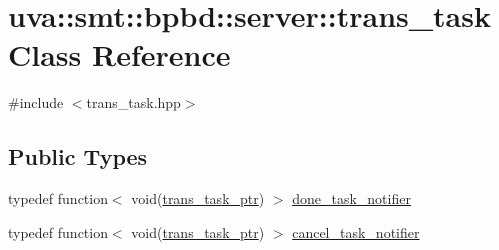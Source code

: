 \hypertarget{classuva_1_1smt_1_1bpbd_1_1server_1_1trans__task}{}\section{uva\+:\+:smt\+:\+:bpbd\+:\+:server\+:\+:trans\+\_\+task Class Reference}
\label{classuva_1_1smt_1_1bpbd_1_1server_1_1trans__task}


{\ttfamily \#include $<$trans\+\_\+task.\+hpp$>$}

\subsection*{Public Types}
\begin{DoxyCompactItemize}
\item 
typedef function$<$ void(\hyperlink{namespaceuva_1_1smt_1_1bpbd_1_1server_a4dea4bb1185fe5d148be18ad12fea74a}{trans\+\_\+task\+\_\+ptr}) $>$ \hyperlink{classuva_1_1smt_1_1bpbd_1_1server_1_1trans__task_a0bbeddd9f0896c3ecb32ed4c2c5e66e1}{done\+\_\+task\+\_\+notifier}
\item 
typedef function$<$ void(\hyperlink{namespaceuva_1_1smt_1_1bpbd_1_1server_a4dea4bb1185fe5d148be18ad12fea74a}{trans\+\_\+task\+\_\+ptr}) $>$ \hyperlink{classuva_1_1smt_1_1bpbd_1_1server_1_1trans__task_aa3ee37277c0d0fd6ffdb44b67f1a5384}{cancel\+\_\+task\+\_\+notifier}
\end{DoxyCompactItemize}
